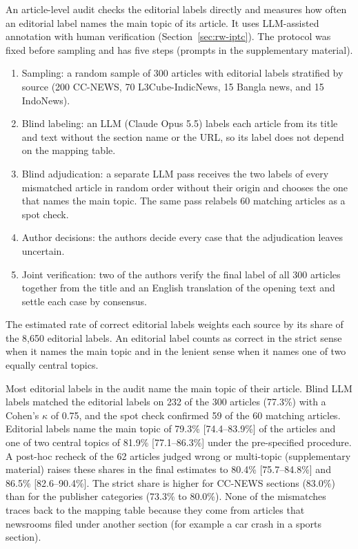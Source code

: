 \documentclass{ieeeaccess}
\begin{document}
An article-level audit checks the editorial labels directly and measures how often an editorial label names the main topic of its article. It uses LLM-assisted annotation with human verification (Section~\ref{sec:rw-iptc}). The protocol was fixed before sampling and has five steps (prompts in the supplementary material).
\begin{enumerate}
  \item Sampling: a random sample of 300 articles with editorial labels stratified by source (200 CC-NEWS, 70 L3Cube-IndicNews, 15 Bangla news, and 15 IndoNews).
  \item Blind labeling: an LLM (Claude Opus 5.5) labels each article from its title and text without the section name or the URL, so its label does not depend on the mapping table.
  \item Blind adjudication: a separate LLM pass receives the two labels of every mismatched article in random order without their origin and chooses the one that names the main topic. The same pass relabels 60 matching articles as a spot check.
  \item Author decisions: the authors decide every case that the adjudication leaves uncertain.
  \item Joint verification: two of the authors verify the final label of all 300 articles together from the title and an English translation of the opening text and settle each case by consensus.
\end{enumerate}
The estimated rate of correct editorial labels weights each source by its share of the 8,650 editorial labels. An editorial label counts as correct in the strict sense when it names the main topic and in the lenient sense when it names one of two equally central topics.

Most editorial labels in the audit name the main topic of their article. Blind LLM labels matched the editorial labels on 232 of the 300 articles (77.3\%) with a Cohen's $\kappa$ of 0.75, and the spot check confirmed 59 of the 60 matching articles. Editorial labels name the main topic of 79.3\% [74.4--83.9\%] of the articles and one of two central topics of 81.9\% [77.1--86.3\%] under the pre-specified procedure. A post-hoc recheck of the 62 articles judged wrong or multi-topic (supplementary material) raises these shares in the final estimates to 80.4\% [75.7--84.8\%] and 86.5\% [82.6--90.4\%]. The strict share is higher for CC-NEWS sections (83.0\%) than for the publisher categories (73.3\% to 80.0\%). None of the mismatches traces back to the mapping table because they come from articles that newsrooms filed under another section (for example a car crash in a sports section).
\end{document}
